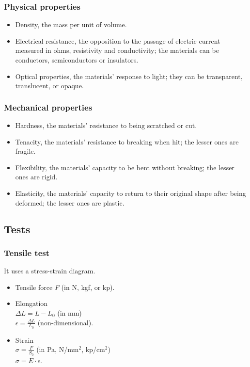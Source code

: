 \documentclass{article}
\begin{document}
\subsubsection*{Physical properties}

\begin{itemize}
    \item Density, the mass per unit of volume.
    \item Electrical resistance, the opposition to the passage of electric
    current measured in ohms, resistivity and conductivity; the materials can be
    conductors, semiconductors or insulators.
    \item Optical properties, the materials' response to light; they can be
    transparent, translucent, or opaque.
\end{itemize}

\subsubsection*{Mechanical properties}

\begin{itemize}
    \item Hardness, the materials' resistance to being scratched or cut.
    \item Tenacity, the materials' resistance to breaking when hit; the lesser
    ones are fragile.
    \item Flexibility, the materials' capacity to be bent without breaking; the
    lesser ones are rigid.
    \item Elasticity, the materials' capacity to return to their original shape
    after being deformed; the lesser ones are plastic.
\end{itemize}

\subsection*{Tests}

\subsubsection*{Tensile test}

It uses a stress-strain diagram.

\begin{itemize}
    \item Tensile force \emph{F} (in N, kgf, or kp).
    \item Elongation \\ $\Delta L = L - L_0$ (in mm) \\ $\epsilon =
    \frac{\Delta L}{L_0}$ (non-dimensional).
    \item Strain \\ $\sigma = \frac{F}{S_0}$ (in Pa, N/mm$^2$, kp/cm$^2$) \\
    $\sigma = E \cdot \epsilon$.
\end{itemize}
\end{document}
